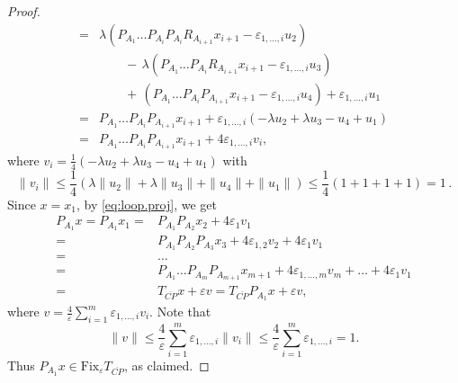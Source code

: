 \documentclass[12pt]{article}
\theoremstyle{definition}
\newcommand{\Fixepsilon}{{\mathrm{Fix}_{\varepsilon} }}
\begin{document}
\begin{proof}
\begin{equation}
\begin{array}{rl}
=&\lambda (P_{A_1} \dots P_{A_i} P_{A_i}R_{A_{i+1}}x_{i+1}-\varepsilon_{1,\dots,i} u_2)\\
& \qquad-\,\lambda (P_{A_1} \dots P_{A_i} R_{A_{i+1}}x_{i+1}-\varepsilon_{1,\dots,i} u_3)\\
&\qquad+\, (P_{A_1} \dots P_{A_i}P_{A_{i+1}}x_{i+1}-\varepsilon_{1,\dots,i} u_4) +\varepsilon_{1,\dots,i}  u_1\\
=&P_{A_1} \dots P_{A_i}P_{A_{i+1}}x_{i+1}+\varepsilon_{1,\dots,i}(-\lambda u_2+\lambda u_3-u_4+u_1)\\
=&P_{A_1} \dots P_{A_i}P_{A_{i+1}}x_{i+1} +4\varepsilon_{1,\dots,i} v_i,
\end{array}
\end{equation}
where $v_i=\frac{1}{4}(-\lambda u_2+\lambda u_3-u_4+u_1)$ with
\begin{equation}
\|v_i\|\le \frac{1}{4}(\lambda \|u_2\|+\lambda \|u_3\|+\|u_4\|+\|u_1\|)\le \frac{1}{4}(1+1+1+1)=1\,.
\end{equation}
Since $x=x_1$, by \eqref{eq:loop.proj}, we get
\begin{equation}
    \begin{array}{rl}
         P_{A_1}x=P_{A_1}x_1=& P_{A_1}P_{A_2}x_2+4\varepsilon_1 v_1\\ 
         =&P_{A_1}P_{A_2}P_{A_3}x_3+4\varepsilon_{1,2} v_2+4\varepsilon_1 v_1\\
         =& \dots\\
        =&P_{A_1}\dots P_{A_m}P_{A_{m+1}}x_{m+1}+4\varepsilon_{1,\dots,m} v_m+\dots+4\varepsilon_1 v_1\\
        =&T_{\overline{CP}}x +\varepsilon v = T_{\overline{CP}}P_{A_1}x + \varepsilon v,
    \end{array}
\end{equation}
where $v=\frac{4}{\varepsilon}\sum_{i=1}^m \varepsilon_{1,\dots,i} v_i$.
Note that 
\begin{equation}
\|v\|\le \frac{4}{\varepsilon}\sum_{i=1}^m \varepsilon_{1,\dots,i} \|v_i\|\le \frac{4}{\varepsilon} \sum_{i=1}^m \varepsilon_{1,\dots,i}=1.
\end{equation}
Thus $P_{A_1}x\in\Fixepsilon T_{\overline{CP}}$, as claimed.
\end{proof}
\end{document}
